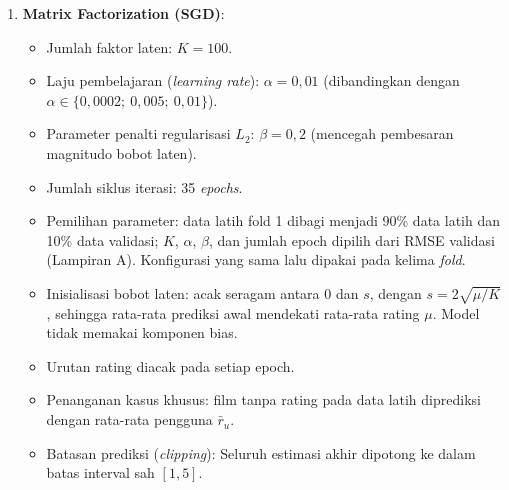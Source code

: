 \begin{enumerate}
    \item \textbf{Matrix Factorization (SGD)}:
    \begin{itemize}
        \item Jumlah faktor laten: $K = 100$.
        \item Laju pembelajaran (\textit{learning rate}): $\alpha = 0,01$ (dibandingkan dengan $\alpha \in \{0,0002;\ 0,005;\ 0,01\}$).
        \item Parameter penalti regularisasi $L_2$: $\beta = 0,2$ (mencegah pembesaran magnitudo bobot laten).
        \item Jumlah siklus iterasi: 35 \textit{epochs}.
        \item Pemilihan parameter: data latih fold 1 dibagi menjadi 90\% data latih dan 10\% data validasi; $K$, $\alpha$, $\beta$, dan jumlah epoch dipilih dari RMSE validasi (Lampiran A). Konfigurasi yang sama lalu dipakai pada kelima \textit{fold}.
        \item Inisialisasi bobot laten: acak seragam antara 0 dan $s$, dengan $s = 2\sqrt{\mu / K}$, sehingga rata-rata prediksi awal mendekati rata-rata rating $\mu$. Model tidak memakai komponen bias.
        \item Urutan rating diacak pada setiap epoch.
        \item Penanganan kasus khusus: film tanpa rating pada data latih diprediksi dengan rata-rata pengguna $\bar{r}_u$.
        \item Batasan prediksi (\textit{clipping}): Seluruh estimasi akhir dipotong ke dalam batas interval sah $[1, 5]$.
    \end{itemize}
\end{enumerate}

